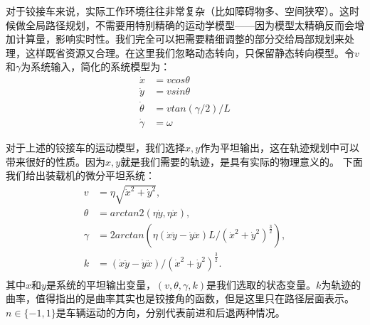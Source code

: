 \documentclass[master,academic]{ysuthesis} %
\begin{document}
		对于铰接车来说，实际工作环境往往非常复杂（比如障碍物多、空间狭窄）。这时候做全局路径规划，不需要用特别精确的运动学模型——因为模型太精确反而会增加计算量，影响实时性。我们完全可以把需要精细调整的部分交给局部规划来处理，这样既省资源又合理。在这里我们忽略动态转向，只保留静态转向模型。令$v$和$\gamma$为系统输入，简化的系统模型为：
		\begin{equation}
			\begin{aligned}
				\dot{x} &= vcos\theta\\
				\dot{y} &= vsin\theta\\
				\dot{\theta} &= vtan( \gamma /2 ) /L\\
				\dot{\gamma} &= \omega
			\end{aligned}
		\end{equation}
	

		对于上述的铰接车的运动模型，我们选择$x,y$作为平坦输出，这在轨迹规划中可以带来很好的性质。因为$x,y$就是我们需要的轨迹，是具有实际的物理意义的。
		下面我们给出装载机的微分平坦系统：
		\begin{equation}
			\begin{aligned}
				v&=\eta \sqrt{\dot{x}^2+\dot{y}^2},\\
				\theta &=arctan2( \eta \dot{y},\eta \dot{x} ) ,\\
				\gamma &=2arctan( \eta ( \dot{x}\ddot{y}-\dot{y}\ddot{x} ) L/( \dot{x}^2+\dot{y}^2 ) ^{\frac{3}{2}} ) ,\\
				k&=( \dot{x}\ddot{y}-\dot{y}\ddot{x} ) /( \dot{x}^2+\dot{y}^2 ) ^{\frac{3}{2}}.\\
			\end{aligned}
		\end{equation}
	其中$x$和$y$是系统的平坦输出变量，$(v,\theta,\gamma,k)$是我们选取的状态变量。$k$为轨迹的曲率，值得指出的是曲率其实也是铰接角的函数，但是这里只在路径层面表示。$n\in\{-1,1\}$是车辆运动的方向，分别代表前进和后退两种情况。
\end{document}

